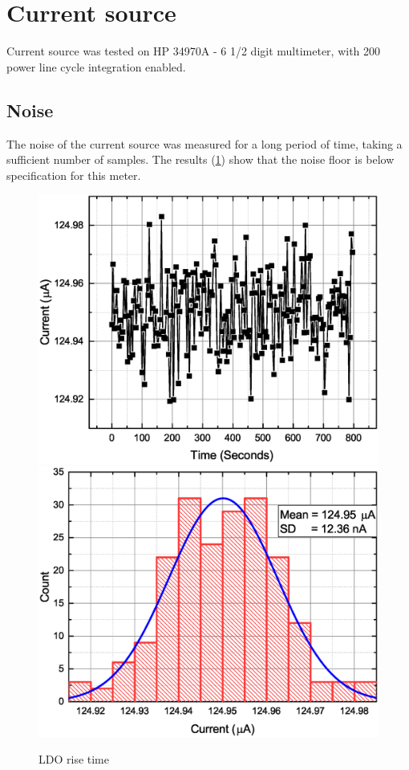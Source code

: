 \section{Current source}
    Current source was tested on HP 34970A - 6 1/2 digit multimeter, with 200 power line cycle integration enabled.

    \subsection{Noise}
        The noise of the current source was measured for a long period of time, taking a sufficient number of samples. The results (\ref{Current_Stability}) show that the noise floor is below specification for this meter.

        \begin{figure}[H]
            \centering
            \includegraphics[width=0.6\paperwidth]{img/07/current_time.eps}
            \includegraphics[width=0.6\paperwidth]{img/07/current_hist.eps}
            \caption{LDO rise time}
            \label{Current_Stability}
        \end{figure}

